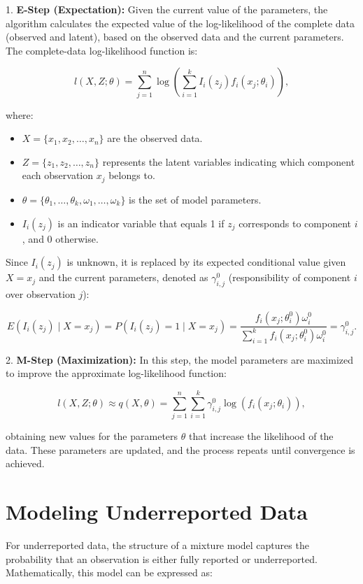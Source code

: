 \documentclass[acmsmall, nonacm]{acmart}
\begin{document}
1. \textbf{E-Step (Expectation):} Given the current value of the parameters, the algorithm calculates the expected value of the log-likelihood of the complete data (observed and latent), based on the observed data and the current parameters. The complete-data log-likelihood function is:

    \[
    l(X, Z; \theta) = \sum_{j=1}^n \log\left(\sum_{i=1}^k I_i(z_j) f_i(x_j; \theta_i)\right),
    \]

    where:
    \begin{itemize}
        \item \( X = \{x_1, x_2, \dots, x_n\} \) are the observed data.
        \item \( Z = \{z_1, z_2, \dots, z_n\} \) represents the latent variables indicating which component each observation \( x_j \) belongs to.
        \item \( \theta = \{\theta_1, \dots, \theta_k, \omega_1, \dots, \omega_k\} \) is the set of model parameters.
        \item \( I_i(z_j) \) is an indicator variable that equals 1 if \( z_j \) corresponds to component \( i \), and 0 otherwise.
    \end{itemize}

    Since \( I_i(z_j) \) is unknown, it is replaced by its expected conditional value given \( X = x_j \) and the current parameters, denoted as \( \gamma_{i,j}^0 \) (responsibility of component \( i \) over observation \( j \)):

    \[
    E(I_i(z_j) \mid X = x_j) = P(I_i(z_j) = 1 \mid X = x_j) = \frac{f_i(x_j; \theta_i^0) \omega_i^0}{\sum_{i=1}^k f_i(x_j; \theta_i^0) \omega_i^0} = \gamma_{i,j}^0.
    \]

2. \textbf{M-Step (Maximization):} In this step, the model parameters are maximized to improve the approximate log-likelihood function:

    \[
    l(X, Z; \theta) \approx q(X, \theta) = \sum_{j=1}^n \sum_{i=1}^k \gamma_{i,j}^0 \log(f_i(x_j; \theta_i)),
    \]

    obtaining new values for the parameters \( \theta \) that increase the likelihood of the data. These parameters are updated, and the process repeats until convergence is achieved.

\section{Modeling Underreported Data}

For underreported data, the structure of a mixture model captures the probability that an observation is either fully reported or underreported. Mathematically, this model can be expressed as:
\end{document}
